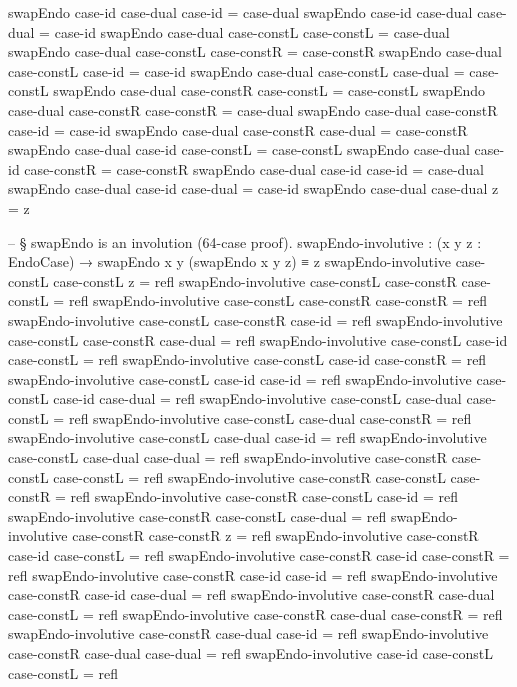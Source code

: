 \documentclass[11pt,a4paper]{book}
\begin{document}
\begin{code}
swapEndo case-id case-dual case-id     = case-dual
swapEndo case-id case-dual case-dual   = case-id
swapEndo case-dual case-constL case-constL = case-dual
swapEndo case-dual case-constL case-constR = case-constR
swapEndo case-dual case-constL case-id     = case-id
swapEndo case-dual case-constL case-dual   = case-constL
swapEndo case-dual case-constR case-constL = case-constL
swapEndo case-dual case-constR case-constR = case-dual
swapEndo case-dual case-constR case-id     = case-id
swapEndo case-dual case-constR case-dual   = case-constR
swapEndo case-dual case-id     case-constL = case-constL
swapEndo case-dual case-id     case-constR = case-constR
swapEndo case-dual case-id     case-id     = case-dual
swapEndo case-dual case-id     case-dual   = case-id
swapEndo case-dual case-dual z = z

-- § swapEndo is an involution (64-case proof).
swapEndo-involutive : (x y z : EndoCase) → swapEndo x y (swapEndo x y z) ≡ z
swapEndo-involutive case-constL case-constL z = refl
swapEndo-involutive case-constL case-constR case-constL = refl
swapEndo-involutive case-constL case-constR case-constR = refl
swapEndo-involutive case-constL case-constR case-id     = refl
swapEndo-involutive case-constL case-constR case-dual   = refl
swapEndo-involutive case-constL case-id     case-constL = refl
swapEndo-involutive case-constL case-id     case-constR = refl
swapEndo-involutive case-constL case-id     case-id     = refl
swapEndo-involutive case-constL case-id     case-dual   = refl
swapEndo-involutive case-constL case-dual   case-constL = refl
swapEndo-involutive case-constL case-dual   case-constR = refl
swapEndo-involutive case-constL case-dual   case-id     = refl
swapEndo-involutive case-constL case-dual   case-dual   = refl
swapEndo-involutive case-constR case-constL case-constL = refl
swapEndo-involutive case-constR case-constL case-constR = refl
swapEndo-involutive case-constR case-constL case-id     = refl
swapEndo-involutive case-constR case-constL case-dual   = refl
swapEndo-involutive case-constR case-constR z = refl
swapEndo-involutive case-constR case-id     case-constL = refl
swapEndo-involutive case-constR case-id     case-constR = refl
swapEndo-involutive case-constR case-id     case-id     = refl
swapEndo-involutive case-constR case-id     case-dual   = refl
swapEndo-involutive case-constR case-dual   case-constL = refl
swapEndo-involutive case-constR case-dual   case-constR = refl
swapEndo-involutive case-constR case-dual   case-id     = refl
swapEndo-involutive case-constR case-dual   case-dual   = refl
swapEndo-involutive case-id case-constL case-constL = refl

\end{code}
\end{document}
